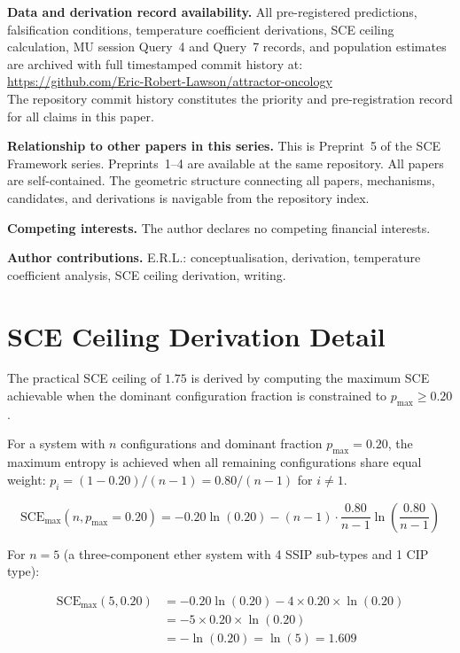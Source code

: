 \documentclass[11pt]{article}
\theoremstyle{plain}
\theoremstyle{definition}
\theoremstyle{remark}
\begin{document}
\bigskip
\noindent\textbf{Data and derivation record availability.}
All pre-registered predictions, falsification conditions,
temperature coefficient derivations, SCE ceiling calculation,
MU session Query~4 and Query~7 records, and population estimates
are archived with full timestamped commit history at:\\
\url{https://github.com/Eric-Robert-Lawson/attractor-oncology}\\
The repository commit history constitutes the priority and
pre-registration record for all claims in this paper.

\noindent\textbf{Relationship to other papers in this series.}
This is Preprint~5 of the SCE Framework series.
Preprints~1--4 are available at the same repository.
All papers are self-contained.  The geometric structure connecting
all papers, mechanisms, candidates, and derivations is navigable
from the repository index.

\noindent\textbf{Competing interests.}
The author declares no competing financial interests.

\noindent\textbf{Author contributions.}
E.R.L.: conceptualisation, derivation, temperature coefficient
analysis, SCE ceiling derivation, writing.

\appendix

\section{SCE Ceiling Derivation Detail}
\label{app:ceiling}

The practical SCE ceiling of $1.75$ is derived by computing the
maximum SCE achievable when the dominant configuration fraction
is constrained to $p_{\max} \geq 0.20$.

For a system with $n$ configurations and dominant fraction
$p_{\max} = 0.20$, the maximum entropy is achieved when all
remaining configurations share equal weight:
$p_i = (1 - 0.20)/(n-1) = 0.80/(n-1)$ for $i \neq 1$.

\begin{equation}
  \mathrm{SCE}_{\max}(n, p_{\max} = 0.20) =
  -0.20\ln(0.20) - (n-1) \cdot \frac{0.80}{n-1} \ln\left(\frac{0.80}{n-1}\right)
\end{equation}

For $n = 5$ (a three-component ether system with 4 SSIP sub-types
and 1 CIP type):

\begin{align}
  \mathrm{SCE}_{\max}(5, 0.20)
  &= -0.20\ln(0.20) - 4 \times 0.20 \times \ln(0.20)\\
  &= -5 \times 0.20 \times \ln(0.20)\\
  &= -\ln(0.20) = \ln(5) = 1.609
\end{align}
\end{document}
